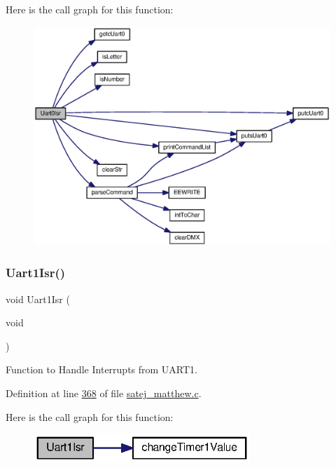 Here is the call graph for this function\+:
\nopagebreak
\begin{figure}[H]
\begin{center}
\leavevmode
\includegraphics[width=350pt]{satej__matthew_8c_a039b2e346ff80ac384bb076fc5290996_cgraph}
\end{center}
\end{figure}
\mbox{\label{satej__matthew_8c_a522b69f2f6e7fa7fc03d455ec3ffb6e8}} 
\subsubsection{\texorpdfstring{Uart1Isr()}{Uart1Isr()}}
{\footnotesize\ttfamily void Uart1\+Isr (\begin{DoxyParamCaption}\item[{void}]{ }\end{DoxyParamCaption})}



Function to Handle Interrupts from U\+A\+R\+T1. 



Definition at line \mbox{\hyperlink{satej__matthew_8c_source_l00368}{368}} of file \mbox{\hyperlink{satej__matthew_8c_source}{satej\+\_\+matthew.\+c}}.

Here is the call graph for this function\+:
\nopagebreak
\begin{figure}[H]
\begin{center}
\leavevmode
\includegraphics[width=232pt]{satej__matthew_8c_a522b69f2f6e7fa7fc03d455ec3ffb6e8_cgraph}
\end{center}
\end{figure}
\mbox{\label{satej__matthew_8c_af97018ae05e94f602f956c08ef08c36c}} 
